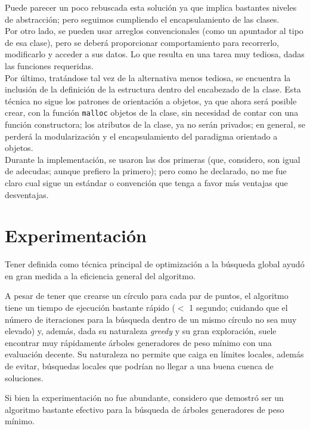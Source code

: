 \documentclass[a4paper]{report}
\begin{document}
  Puede parecer un poco rebuscada esta soluci\'on ya que implica bastantes niveles de abstracci\'on;
  pero seguimos cumpliendo el encapsulamiento de las clases.\\

  Por otro lado, se pueden usar arreglos convencionales (como un apuntador al tipo de esa clase),
  pero se deber\'a proporcionar comportamiento para recorrerlo, modificarlo y acceder a sus datos.
  Lo que resulta en una tarea muy tediosa, dadas las funciones requeridas.\\

  Por \'ultimo, trat\'andose tal vez de la alternativa menos tediosa, se encuentra la inclusi\'on
  de la definici\'on de la estructura dentro del encabezado de la clase. Esta t\'ecnica no sigue
  los patrones de orientaci\'on a objetos, ya que ahora ser\'a posible crear, con la funci\'on
  \texttt{malloc} objetos de la clase, sin necesidad de contar con una funci\'on constructora;
  los atributos de la clase, ya no ser\'an privados; en general, se perder\'a la modularizaci\'on
  y el encapsulamiento del paradigma orientado a objetos.\\

  Durante la implementaci\'on, se usaron las dos primeras (que, considero, son igual de adecudas;
  aunque prefiero la primero); pero como he declarado, no me fue claro cual sigue un est\'andar
  o convenci\'on que tenga a favor m\'as ventajas que desventajas.

  \chapter{Experimentaci\'on}
  Tener definida como t\'ecnica principal de optimizaci\'on a la b\'usqueda global ayud\'o en gran
  medida a la eficiencia general del algoritmo.

  A pesar de tener que crearse un c\'irculo para cada par de puntos, el algoritmo tiene un tiempo
  de ejecuci\'on bastante r\'apido ($<$ 1 segundo; cuidando que el n\'umero de iteraciones para
  la b\'usqueda dentro de un mismo c\'irculo no sea muy elevado) y, adem\'as, dada su naturaleza
  \textit{greedy} y su gran exploraci\'on, suele encontrar muy r\'apidamente \'arboles generadores
  de peso m\'inimo con una evaluaci\'on decente. Su naturaleza no permite que caiga en l\'imites
  locales, adem\'as de evitar, b\'usquedas locales que podr\'ian no llegar a una buena cuenca de
  soluciones.

  Si bien la experimentaci\'on no fue abundante, considero que demostr\'o ser un algoritmo bastante
  efectivo para la b\'usqueda de \'arboles generadores de peso m\'inimo.
\end{document}
